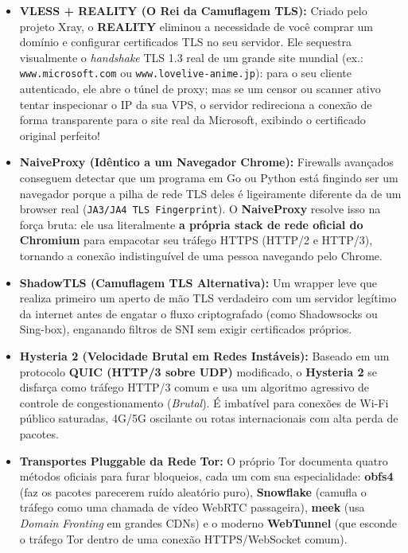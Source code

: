\documentclass{pousadaguide}
\begin{document}
\begin{itemize}
  \item \textbf{VLESS + REALITY (O Rei da Camuflagem TLS):} Criado pelo projeto Xray, o \textbf{REALITY} eliminou a necessidade de você comprar um domínio e configurar certificados TLS no seu servidor. Ele sequestra visualmente o \emph{handshake} TLS 1.3 real de um grande site mundial (ex.: \texttt{www.microsoft.com} ou \texttt{www.lovelive-anime.jp}): para o seu cliente autenticado, ele abre o túnel de proxy; mas se um censor ou scanner ativo tentar inspecionar o IP da sua VPS, o servidor redireciona a conexão de forma transparente para o site real da Microsoft, exibindo o certificado original perfeito!
  \item \textbf{NaiveProxy (Idêntico a um Navegador Chrome):} Firewalls avançados conseguem detectar que um programa em Go ou Python está fingindo ser um navegador porque a pilha de rede TLS deles é ligeiramente diferente da de um browser real (\texttt{JA3/JA4 TLS Fingerprint}). O \textbf{NaiveProxy} resolve isso na força bruta: ele usa literalmente \textbf{a própria stack de rede oficial do Chromium} para empacotar seu tráfego HTTPS (HTTP/2 e HTTP/3), tornando a conexão indistinguível de uma pessoa navegando pelo Chrome.
  \item \textbf{ShadowTLS (Camuflagem TLS Alternativa):} Um wrapper leve que realiza primeiro um aperto de mão TLS verdadeiro com um servidor legítimo da internet antes de engatar o fluxo criptografado (como Shadowsocks ou Sing-box), enganando filtros de SNI sem exigir certificados próprios.
  \item \textbf{Hysteria 2 (Velocidade Brutal em Redes Instáveis):} Baseado em um protocolo \textbf{QUIC (HTTP/3 sobre UDP)} modificado, o \textbf{Hysteria 2} se disfarça como tráfego HTTP/3 comum e usa um algoritmo agressivo de controle de congestionamento (\emph{Brutal}). É imbatível para conexões de Wi-Fi público saturadas, 4G/5G oscilante ou rotas internacionais com alta perda de pacotes.
  \item \textbf{Transportes Pluggable da Rede Tor:} O próprio Tor documenta quatro métodos oficiais para furar bloqueios, cada um com sua especialidade: \textbf{obfs4} (faz os pacotes parecerem ruído aleatório puro), \textbf{Snowflake} (camufla o tráfego como uma chamada de vídeo WebRTC passageira), \textbf{meek} (usa \emph{Domain Fronting} em grandes CDNs) e o moderno \textbf{WebTunnel} (que esconde o tráfego Tor dentro de uma conexão HTTPS/WebSocket comum).
\end{itemize}
\end{document}
